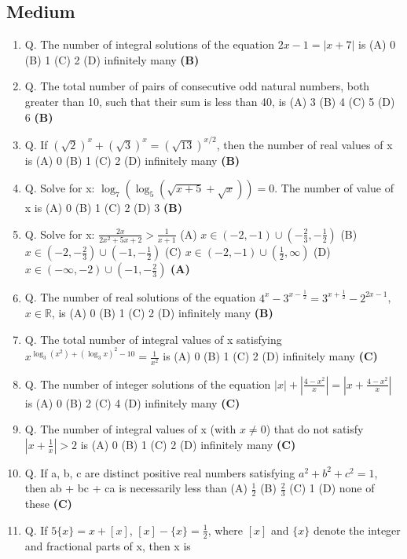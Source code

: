 \documentclass{article}
\begin{document}
\subsection{Medium}
\begin{enumerate}
\item Q. The number of integral solutions of the equation
$2x - 1 = |x + 7|$
is
(A) 0
(B) 1
(C) 2
(D) infinitely many \hfill \textbf{(B)}
\item Q. The total number of pairs of consecutive odd natural numbers, both greater than 10,
such that their sum is less than 40, is
(A) 3
(B) 4
(C) 5
(D) 6 \hfill \textbf{(B)}
\item Q. If
$(\sqrt{2})^x + (\sqrt{3})^x = (\sqrt{13})^{x/2}$,
then the number of real values of x is
(A) 0
(B) 1
(C) 2
(D) infinitely many \hfill \textbf{(B)}
\item Q. Solve for x:
$\log_7(\log_5(\sqrt{x + 5} + \sqrt{x})) = 0$.
The number of value of x is
(A) 0
(B) 1
(C) 2
(D) 3 \hfill \textbf{(B)}
\item Q. Solve for x:
$\frac{2x}{2x^2 + 5x + 2} > \frac{1}{x + 1}$
(A) $x \in (-2, -1) \cup (-\frac{2}{3}, -\frac{1}{2})$
(B) $x \in (-2, -\frac{2}{3}) \cup (-1, -\frac{1}{2})$
(C) $x \in (-2, -1) \cup (\frac{1}{2}, \infty)$
(D) $x \in (-\infty, -2) \cup (-1, -\frac{2}{3})$ \hfill \textbf{(A)}
\item Q. The number of real solutions of the equation
$4^x - 3^{x - \frac{1}{2}} = 3^{x + \frac{1}{2}} - 2^{2x - 1}$,
$x \in \mathbb{R}$,
is
(A) 0
(B) 1
(C) 2
(D) infinitely many \hfill \textbf{(B)}
\item Q. The total number of integral values of x satisfying
$x^{\log_3 (x^2) + (\log_3 x)^2 - 10} = \frac{1}{x^2}$
is
(A) 0
(B) 1
(C) 2
(D) infinitely many \hfill \textbf{(C)}
\item Q. The number of integer solutions of the equation
$|x| + |\frac{4 - x^2}{x}| = |x + \frac{4 - x^2}{x}|$
is
(A) 0
(B) 2
(C) 4
(D) infinitely many \hfill \textbf{(C)}
\item Q. The number of integral values of x (with $x \neq 0$) that do not satisfy
$|x + \frac{1}{x}| > 2$
is
(A) 0
(B) 1
(C) 2
(D) infinitely many \hfill \textbf{(C)}
\item Q. If a, b, c are distinct positive real numbers satisfying
$a^2 + b^2 + c^2 = 1$,
then ab + bc + ca is necessarily less than
(A) $\frac{1}{2}$
(B) $\frac{2}{3}$
(C) 1
(D) none of these \hfill \textbf{(C)}
\item Q. If
$5\{x\} = x + [x]$, $[x] - \{x\} = \frac{1}{2}$,
where $[x]$ and $\{x\}$ denote the integer and fractional parts of x, then x is

\end{enumerate}
\end{document}
